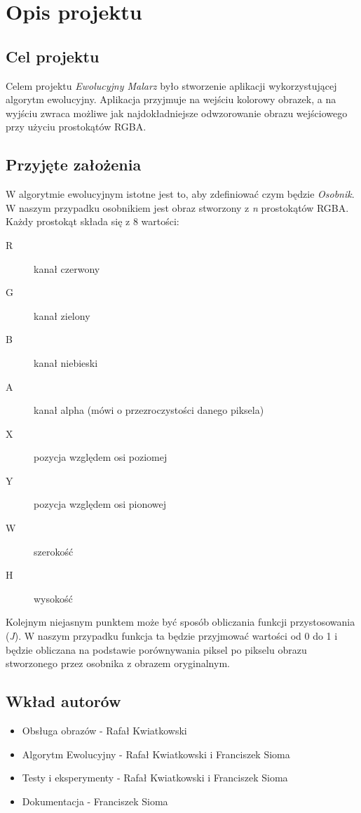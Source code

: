 \section{Opis projektu}
\subsection{Cel projektu}
Celem projektu {\it Ewolucyjny Malarz} było stworzenie aplikacji wykorzystującej algorytm ewolucyjny. Aplikacja przyjmuje na wejściu kolorowy obrazek, a na wyjściu zwraca możliwe jak najdokładniejsze odwzorowanie obrazu wejściowego przy użyciu prostokątów RGBA. 

\subsection{Przyjęte założenia}
W algorytmie ewolucyjnym istotne jest to, aby zdefiniować czym będzie {\it Osobnik}. W naszym przypadku osobnikiem jest obraz stworzony z {\it n} prostokątów RGBA. Każdy prostokąt składa się z 8 wartości: 
\begin{description}
    \item[R] kanał czerwony
    \item[G] kanał zielony
    \item[B] kanał niebieski
    \item[A] kanał alpha (mówi o przezroczystości danego piksela)
    \item[X] pozycja względem osi poziomej
    \item[Y] pozycja względem osi pionowej
    \item[W] szerokość
    \item[H] wysokość       
\end{description}

Kolejnym niejasnym punktem może być sposób obliczania funkcji przystosowania ({\it J}). W naszym przypadku funkcja ta będzie przyjmować wartości od 0 do 1 i będzie obliczana na podstawie porównywania piksel po pikselu obrazu stworzonego przez osobnika z obrazem oryginalnym.
\subsection{Wkład autorów}
\begin{itemize}
    \item Obsługa obrazów - Rafał Kwiatkowski
    \item Algorytm Ewolucyjny - Rafał Kwiatkowski i Franciszek Sioma
    \item Testy i eksperymenty - Rafał Kwiatkowski i Franciszek Sioma
    \item Dokumentacja - Franciszek Sioma
\end{itemize}
